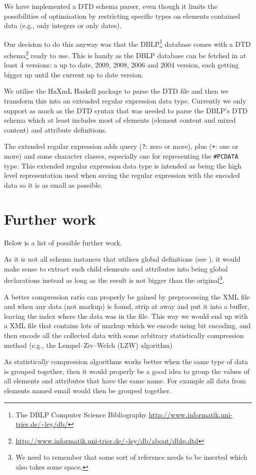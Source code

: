\documentclass[a4paper, oneside]{memoir}
\theoremstyle{definition}
\begin{document}
We have implemented a DTD schema parser, even though it limits the possibilities
of optimisation by restricting specific types on elements contained data (e.g.,
only integers or only dates).

Our decision to do this anyway was that the DBLP\footnote{The DBLP Computer
  Science Bibliography \url{http://www.informatik.uni-trier.de/~ley/db/}}
database comes with a DTD
schema\footnote{\url{http://www.informatik.uni-trier.de/~ley/db/about/dblp.dtd}}
ready to use. This is handy as the DBLP database can be fetched in at least 4
versions: a up to date, 2009, 2008, 2006 and 2004 version, each getting bigger
up until the current up to date version.

We utilise the HaXmL Haskell package to parse the DTD file and then we transform
this into an extended regular expression data type. Currently we only support as
much as the DTD syntax that was needed to parse the DBLP's DTD schema which at
least includes most of elements (element content and mixed content) and
attribute definitions.

The extended regular expression adds query (\texttt{?}: zero or more), plus
(\texttt{+}: one or more) and some character classes, especially one for
representing the \texttt{\#PCDATA} type. This extended regular expression data
type is intended as being the high level representation used when saving the
regular expression with the encoded data so it is as small as possible.

\section{Further work}

Below is a list of possible further work.

\begin{description}
\item[Refactoring] As it is not all schema instances that utilises global
  definitions (see \label{sec:local-global-schema-definitions}), it would make
  sense to extract such child elements and attributes into being global
  declarations instead as long as the result is not bigger than the
  original\footnote{We need to remember that some sort of reference needs to be inserted
    which also takes some space.}.


\item A better compression ratio can properly be gained by preprocessing the XML
  file and when any data (not markup) is found, strip at away and put it into a
  buffer, leaving the index where the data was in the file. This way we would
  end up with a XML file that contains lots of markup which we encode using bit
  encoding, and then encode all the collected data with some arbitrary
  statistically compression method (e.g., the Lempel–Ziv–Welch (LZW) algorithm)

  As statistically compression algorithms works better when the same type of
  data is grouped together, then it would properly be a good idea to group the
  values of all elements and attributes that have the same name. For example all
  data from elements named email would then be grouped together.

\end{description}
\end{document}
